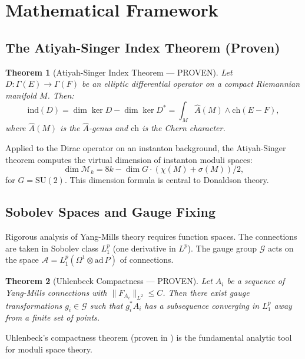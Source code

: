 \documentclass[12pt,a4paper]{amsart}
\newtheorem{theorem}{Theorem}[section]
\theoremstyle{definition}
\theoremstyle{remark}
\begin{document}
\section{Mathematical Framework}
\label{sec:framework}

\subsection{The Atiyah-Singer Index Theorem (Proven)}

\begin{theorem}[Atiyah-Singer Index Theorem — PROVEN]
\label{thm:atiyah-singer}
Let $D: \Gamma(E) \to \Gamma(F)$ be an elliptic differential operator on a compact
Riemannian manifold $M$. Then:
\[
  \mathrm{ind}(D) = \dim \ker D - \dim \ker D^* = \int_M \hat{A}(M) \wedge \mathrm{ch}(E - F),
\]
where $\hat{A}(M)$ is the $\hat{A}$-genus and $\mathrm{ch}$ is the Chern character.
\end{theorem}

Applied to the Dirac operator on an instanton background, the Atiyah-Singer theorem
computes the virtual dimension of instanton moduli spaces:
\[
  \dim \mathcal{M}_k = 8k - \dim G \cdot (\chi(M) + \sigma(M))/2,
\]
for $G = \mathrm{SU}(2)$. This dimension formula is central to Donaldson theory.

\subsection{Sobolev Spaces and Gauge Fixing}

Rigorous analysis of Yang-Mills theory requires function spaces. The connections are
taken in Sobolev class $L^p_1$ (one derivative in $L^p$). The gauge group $\mathcal{G}$
acts on the space $\mathcal{A} = L^p_1(\Omega^1 \otimes \mathrm{ad}\, P)$ of connections.

\begin{theorem}[Uhlenbeck Compactness — PROVEN]
\label{thm:uhlenbeck}
Let $A_i$ be a sequence of Yang-Mills connections with $\|F_{A_i}\|_{L^2} \leq C$.
Then there exist gauge transformations $g_i \in \mathcal{G}$ such that $g_i^* A_i$
has a subsequence converging in $L^p_1$ away from a finite set of points.
\end{theorem}

Uhlenbeck's compactness theorem (proven in \cite{Uhlenbeck1982}) is the fundamental
analytic tool for moduli space theory.
\end{document}

